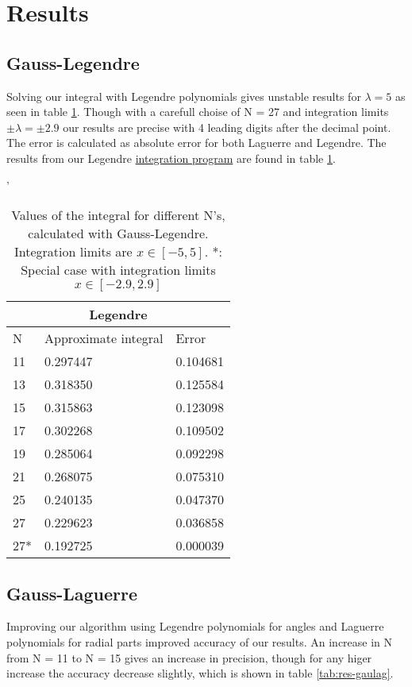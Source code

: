 \documentclass[../main.tex]{subfiles}
\begin{document}
\section{Results} \label{sec:results}
\subsection{Gauss-Legendre} \label{sec:QMGausslegresults}

Solving our integral with Legendre polynomials gives unstable results for $\lambda = 5$ as seen in table \ref{tab:res-gauleg}. Though with a carefull choise of N = 27 and integration limits $\pm \lambda = \pm 2.9$ our results are precise with 4 leading digits after the decimal point. The error is calculated as absolute error for both Laguerre and Legendre.
The results from our Legendre \href{https://github.com/kmaasrud/Project-3/tree/master/code/Gauss-Quadrature}{integration program} are found in table \ref{tab:res-gauleg}.

\begin{table}[h!]'

\begin{center}
  \begin{tabular}{ |p{1cm}|p{4cm}|p{3cm}|}
 \hline
 \multicolumn{3}{|c|}{\textbf{Legendre}} \\
 \hline
       N   &Approximate integral & Error\\
 \hline
 11 & 0.297447 & 0.104681\\
 13 & 0.318350 & 0.125584\\
 15 & 0.315863 & 0.123098\\
 17 & 0.302268 & 0.109502\\
 19 & 0.285064 & 0.092298\\
 21 & 0.268075 & 0.075310\\
 25 & 0.240135 & 0.047370\\
 27 & 0.229623 & 0.036858\\
 27*& 0.192725 & 0.000039\\
 \hline
 \end{tabular}
 \caption{Values of the integral for different N's, calculated with Gauss-Legendre. Integration limits are $x\in[-5,5]$. *: Special case with integration limits $x\in[-2.9,2.9]$}
 \label{tab:res-gauleg}
 \end{center}
\end{table}


\subsection{Gauss-Laguerre} \label{sec:QMQMGausslagresults}
Improving our algorithm using Legendre polynomials for angles and Laguerre polynomials for radial parts improved accuracy of our results. An increase in N from N = 11 to N = 15 gives an increase in precision, though for any higer increase the accuracy decrease slightly, which is shown in table \ref{tab:res-gaulag}.
\end{document}
